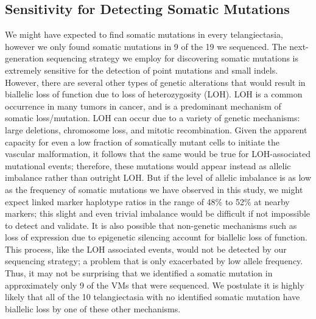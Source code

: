 \subsection{Sensitivity for Detecting Somatic Mutations}
	We might have expected to find somatic mutations in every telangiectasia, however we only found somatic mutations in 9 of the 19 we sequenced. The next-generation sequencing strategy we employ for discovering somatic mutations is extremely sensitive for the detection of point mutations and small indels. However, there are several other types of genetic alterations that would result in biallelic loss of function due to loss of heterozygosity (LOH).  LOH is a common occurrence in many tumors in cancer, and is a predominant mechanism of somatic loss/mutation.  LOH can occur due to a variety of genetic mechanisms: large deletions, chromosome loss, and mitotic recombination. Given the apparent capacity for even a low fraction of somatically mutant cells to initiate the vascular malformation, it follows that the same would be true for LOH-associated mutational events; therefore, these mutations would appear instead as allelic imbalance rather than outright LOH.  But if the level of allelic imbalance is as low as the frequency of somatic mutations we have observed in this study, we might expect linked marker haplotype ratios in the range of 48\% to 52\% at nearby markers; this slight and even trivial imbalance would be difficult if not impossible to detect and validate.  It is also possible that non-genetic mechanisms such as loss of expression due to epigenetic silencing account for biallelic loss of function.  This process, like the LOH associated events, would not be detected by our sequencing strategy; a problem that is only exacerbated by low allele frequency. Thus, it may not be surprising that we identified a somatic mutation in approximately only 9 of the VMs that were sequenced. We postulate it is highly likely that all of the 10 telangiectasia with no identified somatic mutation have biallelic loss by one of these other mechanisms.    
	
